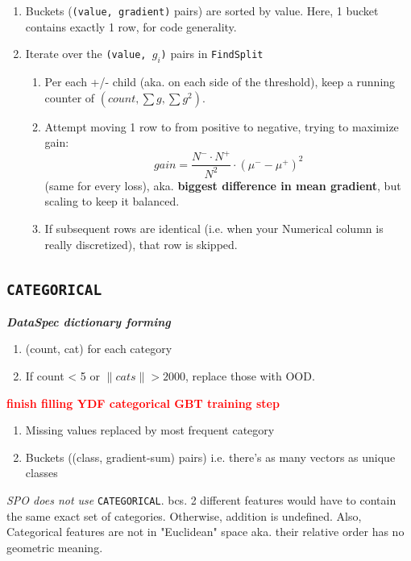 \documentclass[sigconf,screen]{acmart}
\newcommand{\TODO}[1]{\textbf{\textcolor{red}{#1}}}
\begin{document}
\begin{enumerate}
    \item Buckets (\texttt{(value, gradient)} pairs) are sorted by value. Here, 1 bucket contains exactly 1 row, for code generality.
    \item Iterate over the \texttt{(value, $g_i$)} pairs in \texttt{FindSplit}
    \begin{enumerate}
        \item Per each +/- child (aka. on each side of the threshold), keep a running counter of $(count, \sum g, \sum g^2)$.
        \item Attempt moving 1 row to from positive to negative, trying to maximize gain: $$gain = \frac{N^- \cdot N^+}{N^2} \cdot (\mu^- - \mu^+)^2$$ (same for every loss), aka. \textbf{biggest difference in mean gradient}, but scaling to keep it balanced.
        \item If subsequent rows are identical (i.e. when your Numerical column is really discretized), that row is skipped.
    \end{enumerate}
    
\end{enumerate}

\subsection{\texttt{CATEGORICAL}}
\label{sec:ydf-categorical-handling}


\textbf{\textit{DataSpec dictionary forming}}

\begin{enumerate}
    \item (count, cat) for each category
    \item If count < 5 or $\|cats\| > 2000$, replace those with OOD.
\end{enumerate}

\TODO{finish filling YDF categorical GBT training step}

\begin{enumerate}
    \item Missing values replaced by most frequent category
    \item Buckets ((class, gradient-sum) pairs) i.e. there's as many vectors as unique classes
\end{enumerate}

\textit{SPO does not use }\texttt{CATEGORICAL}. bcs. 2 different features would have to contain the same exact set of categories. Otherwise, addition is undefined. Also, Categorical features are not in "Euclidean" space aka. their relative order has no geometric meaning.
\end{document}
